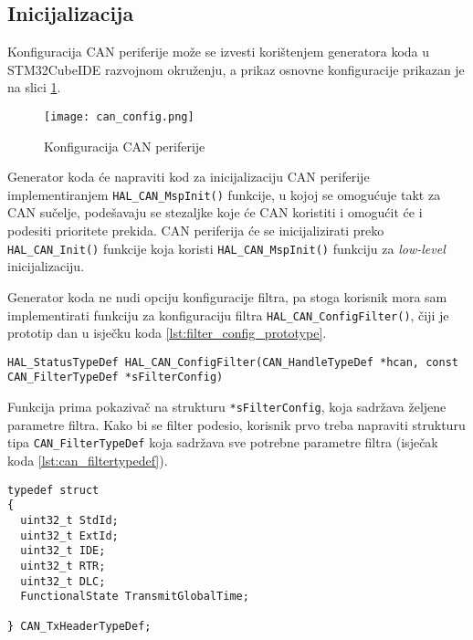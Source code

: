 \subsection{Inicijalizacija}

Konfiguracija CAN periferije može se izvesti korištenjem generatora koda u \\STM32CubeIDE razvojnom okruženju, a prikaz osnovne konfiguracije prikazan je na slici \ref{fig:can_config}.

\begin{figure}[H]
	\centering
	\texttt{[image: can\_config.png]}
	\caption{Konfiguracija CAN periferije}
	\label{fig:can_config}
\end{figure}

\noindent Generator koda će napraviti kod za inicijalizaciju CAN periferije implementiranjem \verb|HAL_CAN_MspInit()| funkcije, u kojoj se omogućuje takt za CAN sučelje, podešavaju se stezaljke koje će CAN koristiti i omogućit će i podesiti prioritete prekida. CAN periferija će se inicijalizirati preko \verb|HAL_CAN_Init()| funkcije koja koristi \verb|HAL_CAN_MspInit()| funkciju za \textit{low-level} inicijalizaciju.

Generator koda ne nudi opciju konfiguracije filtra, pa stoga korisnik mora sam implementirati funkciju za konfiguraciju filtra \verb|HAL_CAN_ConfigFilter()|, čiji je prototip dan u isječku koda \ref{lst:filter_config_prototype}.

\begin{lstlisting}[caption=Prototip funkcije \texttt{HAL\_CAN\_ConfigFilter()}, label={lst:filter_config_prototype}]
HAL_StatusTypeDef HAL_CAN_ConfigFilter(CAN_HandleTypeDef *hcan, const CAN_FilterTypeDef *sFilterConfig)
\end{lstlisting} 

\noindent Funkcija prima pokazivač na strukturu \verb|*sFilterConfig|, koja sadržava željene parametre filtra. Kako bi se filter podesio, korisnik prvo treba napraviti strukturu tipa \verb|CAN_FilterTypeDef| koja sadržava sve potrebne parametre filtra (isječak koda \ref{lst:can_filtertypedef}).

\begin{lstlisting}[caption=\texttt{CAN\_FilterTypeDef} struktura, label={lst:can_filtertypedef}]
typedef struct
{
  uint32_t StdId;
  uint32_t ExtId;
  uint32_t IDE;
  uint32_t RTR;
  uint32_t DLC;
  FunctionalState TransmitGlobalTime;

} CAN_TxHeaderTypeDef;
\end{lstlisting}


